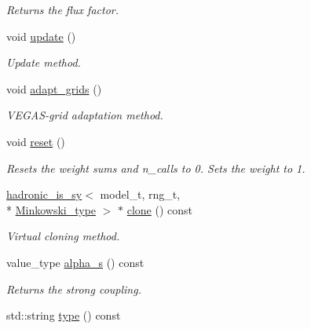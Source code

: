 \begin{DoxyCompactItemize}
\begin{DoxyCompactList}\small\item\em Returns the flux factor. \end{DoxyCompactList}\item 
void \hyperlink{a00255_a6436d3581b268b19b9c4ae576fb2b8f6}{update} ()
\begin{DoxyCompactList}\small\item\em Update method. \end{DoxyCompactList}\item 
\hypertarget{a00255_a758d1e8e7b40f03cc075521722616539}{void \hyperlink{a00255_a758d1e8e7b40f03cc075521722616539}{adapt\-\_\-grids} ()}\label{a00255_a758d1e8e7b40f03cc075521722616539}

\begin{DoxyCompactList}\small\item\em V\-E\-G\-A\-S-\/grid adaptation method. \end{DoxyCompactList}\item 
\hypertarget{a00255_a413a2200c7a02cdf6468b705b624a2e1}{void \hyperlink{a00255_a413a2200c7a02cdf6468b705b624a2e1}{reset} ()}\label{a00255_a413a2200c7a02cdf6468b705b624a2e1}

\begin{DoxyCompactList}\small\item\em Resets the weight sums and n\-\_\-calls to 0. Sets the weight to 1. \end{DoxyCompactList}\item 
\hypertarget{a00255_a8dcae9b69d0c265f56914cd59f18c63e}{\hyperlink{a00254}{hadronic\-\_\-is\-\_\-sy}$<$ model\-\_\-t, rng\-\_\-t, \\*
\hyperlink{a00369}{Minkowski\-\_\-type} $>$ $\ast$ \hyperlink{a00255_a8dcae9b69d0c265f56914cd59f18c63e}{clone} () const }\label{a00255_a8dcae9b69d0c265f56914cd59f18c63e}

\begin{DoxyCompactList}\small\item\em Virtual cloning method. \end{DoxyCompactList}\item 
\hypertarget{a00255_aa3b7deda67549e6eb64d6a975a57247e}{value\-\_\-type \hyperlink{a00255_aa3b7deda67549e6eb64d6a975a57247e}{alpha\-\_\-s} () const }\label{a00255_aa3b7deda67549e6eb64d6a975a57247e}

\begin{DoxyCompactList}\small\item\em Returns the strong coupling. \end{DoxyCompactList}\item 
\hypertarget{a00255_a42bf9e4defb01805c9d591d5c011a56c}{std\-::string \hyperlink{a00255_a42bf9e4defb01805c9d591d5c011a56c}{type} () const }\label{a00255_a42bf9e4defb01805c9d591d5c011a56c}


\end{DoxyCompactItemize}
